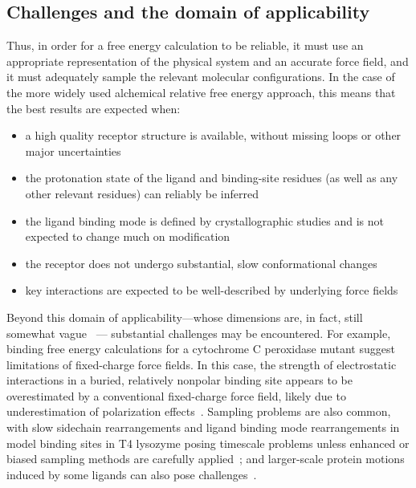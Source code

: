 \documentclass[aps,pre,twocolumn,nofootinbib,superscriptaddress,10pt, final,tightenlines]{revtex4-1}
\begin{document}
\subsection{Challenges and the domain of applicability}
Thus, in order for a free energy calculation to be reliable, it must use an appropriate representation of the physical system and an accurate force field, and it must adequately sample the relevant molecular configurations. 
In the case of the more widely used alchemical relative free energy approach, this means that the best results are expected when:\vspace{2mm}
\begin{itemize}
\item a high quality receptor structure is available, without missing loops or other major uncertainties
\item the protonation state of the ligand and binding-site residues (as well as any other relevant residues) can reliably be inferred
\item the ligand binding mode is defined by crystallographic studies and is not expected to change much on modification
\item the receptor does not undergo substantial, slow conformational changes
\item key interactions are expected to be well-described by underlying force fields 
\end{itemize}
\vspace{2mm}

Beyond this domain of applicability---whose dimensions are, in fact, still somewhat vague~\cite{Abel:2016:vertex} --- substantial challenges may be encountered. 
For example, binding free energy calculations for a cytochrome C peroxidase mutant suggest limitations of fixed-charge force fields. In this case, the strength of electrostatic interactions in a buried, relatively nonpolar binding site appears to be overestimated by a conventional fixed-charge force field, likely due to underestimation of polarization effects~\cite{rocklin_blind_2013}. 
Sampling problems are also common, with slow sidechain rearrangements and ligand binding mode rearrangements in model binding sites in T4 lysozyme posing timescale problems unless enhanced or biased sampling methods are carefully applied~\cite{mobley_confine_2007, boyce_predicting_2009, mobley_predicting_2007, jiang_free_2010, gallicchio_binding_2010, wang_achieving_2012}; and larger-scale protein motions induced by some ligands can also pose challenges~\cite{boyce_predicting_2009, lim_sensitivity_2016}. 
\end{document}
